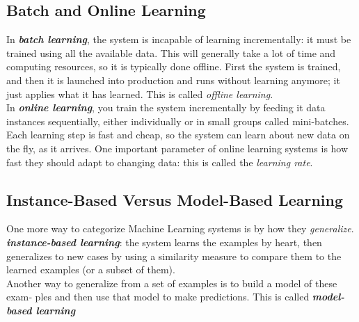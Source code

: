 \subsection*{Batch and Online Learning}
In \textbf{\textit{batch learning}}, the system is incapable of learning incrementally: it must be trained
using all the available data. This will generally take a lot of time and computing
resources, so it is typically done offline. First the system is trained, and then it is
launched into production and runs without learning anymore; it just applies what it
has learned. This is called \textit{offline learning}.\\

In \textbf{\textit{online learning}}, you train the system incrementally by feeding it data instances
sequentially, either individually or in small groups called mini-batches. Each learning
step is fast and cheap, so the system can learn about new data on the fly, as it arrives.
One important parameter of online learning systems is how fast they should adapt to
changing data: this is called the \textit{learning rate}.\\

\subsection*{Instance-Based Versus Model-Based Learning}
One more way to categorize Machine Learning systems is by how they \textit{generalize}.
\textbf{\textit{instance-based learning}}: the system learns the examples by heart, then
generalizes to new cases by using a similarity measure to compare them to the
learned examples (or a subset of them).\\
Another way to generalize from a set of examples is to build a model of these exam‐
ples and then use that model to make predictions. This is called \textbf{\textit{model-based learning}}



